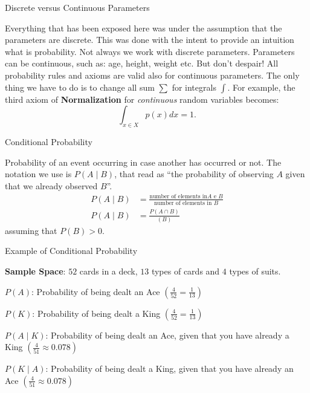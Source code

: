 \begin{frame}{Discrete versus Continuous Parameters}

	Everything that has been exposed here was under the assumption that the
	parameters are discrete.
	This was done with the intent to provide an intuition what is probability.
	Not always we work with discrete parameters.
	Parameters can be continuous, such as: age, height, weight etc.
	But don't despair!
	All probability rules and axioms are valid also for continuous parameters.
	The only thing we have to do is to change all sum $\sum$ for integrals $\int$.
	For example, the third axiom of \textbf{Normalization} for \textit{continuous}
	random variables becomes:
	$$
		\int_{x \in X} p(x) dx = 1.
	$$
\end{frame}


\begin{frame}{Conditional Probability}
	\begin{defn}
		Probability of an event occurring in case another has occurred or not. \newline \newline
		The notation we use is $P( A \mid B )$, that read as ``the probability of
		observing $A$ given that we already observed $B$''. \newline \newline
		$$
			\begin{aligned}
				P(A \mid B) & = \frac{\text{number of elements in$A$ e $B$}}{\text{number of elements in $B$}} \\
				P(A \mid B) & = \frac{P(A \cap B)}{(B)}
			\end{aligned}
		$$
		\newline \hspace{0.7\textwidth}
		{\footnotesize assuming that $P(B) > 0$}.
	\end{defn}
\end{frame}

\begin{frame}{Example of Conditional Probability}
	\begin{example}
		\begin{vfilleditems}
			\item \textbf{Sample Space}: $52$ cards in a deck, $13$ types of cards and $4$ types of suits.
			\item $P(A)$: Probability of being dealt an Ace $\left( \frac{4}{52} = \frac{1}{13}\right)$
			\item $P(K)$: Probability of being dealt a King $\left( \frac{4}{52} = \frac{1}{13} \right)$
			\item $P(A \mid K)$: Probability of being dealt an Ace, given that you have already a King $\left( \frac{4}{51} \approx 0.078 \right)$
			\item $P(K \mid A)$: Probability of being dealt a King, given that you have already an Ace $\left( \frac{4}{51} \approx 0.078 \right)$
		\end{vfilleditems}
	\end{example}
\end{frame}


